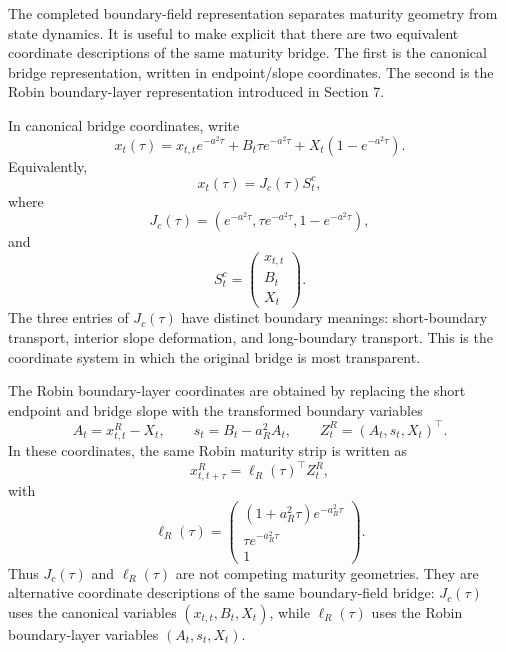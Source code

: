 \documentclass[11pt]{article}
\numberwithin{equation}{section}
\begin{document}
The completed boundary-field representation separates maturity geometry from state dynamics.  It is useful to make explicit that there are two equivalent coordinate descriptions of the same maturity bridge.  The first is the canonical bridge representation, written in endpoint/slope coordinates.  The second is the Robin boundary-layer representation introduced in Section 7.

In canonical bridge coordinates, write
\begin{equation}
\label{eq:canonical-bridge-section10}
x_t(\tau)
=
x_{t,t}e^{-a^2\tau}
+
B_t\tau e^{-a^2\tau}
+
X_t\left(1-e^{-a^2\tau}\right).
\end{equation}
Equivalently,
\begin{equation}
\label{eq:canonical-jacobian-state-representation}
x_t(\tau)=J_c(\tau)S^c_t,
\end{equation}
where
\begin{equation}
\label{eq:boundary-jacobian}
J_c(\tau)
=
\left(
 e^{-a^2\tau},
 \tau e^{-a^2\tau},
 1-e^{-a^2\tau}
\right),
\end{equation}
and
\begin{equation}
\label{eq:canonical-state-vector}
S^c_t=
\begin{pmatrix}
x_{t,t}\\
B_t\\
X_t
\end{pmatrix}.
\end{equation}
The three entries of \(J_c(\tau)\) have distinct boundary meanings: short-boundary transport, interior slope deformation, and long-boundary transport.  This is the coordinate system in which the original bridge is most transparent.

The Robin boundary-layer coordinates are obtained by replacing the short endpoint and bridge slope with the transformed boundary variables
\begin{equation}
\label{eq:robin-coordinate-map-section10}
A_t=x^R_{t,t}-X_t,
\qquad
s_t=B_t-a_R^2A_t,
\qquad
Z^R_t=(A_t,s_t,X_t)^\top.
\end{equation}
In these coordinates, the same Robin maturity strip is written as
\begin{equation}
\label{eq:robin-loading-section10}
x^R_{t,t+\tau}=\ell_R(\tau)^\top Z^R_t,
\end{equation}
with
\begin{equation}
\label{eq:robin-loading-vector-section10}
\ell_R(\tau)
=
\begin{pmatrix}
(1+a_R^2\tau)e^{-a_R^2\tau}\\
\tau e^{-a_R^2\tau}\\
1
\end{pmatrix}.
\end{equation}
Thus \(J_c(\tau)\) and \(\ell_R(\tau)\) are not competing maturity geometries.  They are alternative coordinate descriptions of the same boundary-field bridge: \(J_c(\tau)\) uses the canonical variables \((x_{t,t},B_t,X_t)\), while \(\ell_R(\tau)\) uses the Robin boundary-layer variables \((A_t,s_t,X_t)\).
\end{document}
